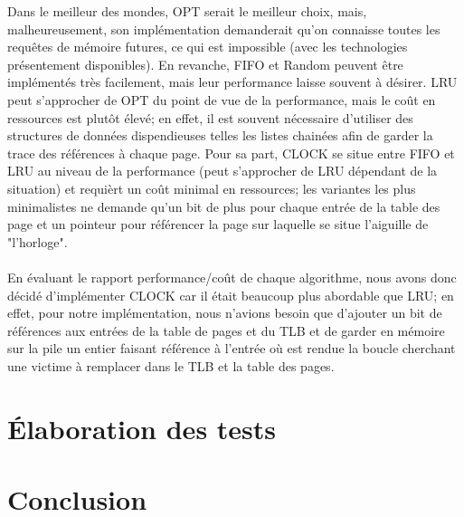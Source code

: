 \documentclass{article}
\begin{document}
Dans le meilleur des mondes, OPT serait le meilleur choix, mais, malheureusement, son implémentation demanderait qu'on connaisse toutes les 
requêtes de mémoire futures, ce qui est impossible (avec les technologies présentement disponibles). En revanche, FIFO et Random peuvent être 
implémentés très facilement, mais leur performance laisse souvent à désirer. LRU peut s'approcher de OPT du point de vue de la performance, mais 
le coût en ressources est plutôt élevé; en effet, il est souvent nécessaire d'utiliser des structures de données dispendieuses telles les listes 
chainées afin de garder la trace des références à chaque page. Pour sa part, CLOCK se situe entre FIFO et LRU au niveau de la performance (peut 
s'approcher de LRU dépendant de la situation) et requièrt un coût minimal en ressources; les variantes les plus minimalistes ne demande qu'un bit 
de plus pour chaque entrée de la table des page et un pointeur pour référencer la page sur laquelle se situe l'aiguille de "l'horloge".\\
\\
En évaluant le rapport performance/coût de chaque algorithme, nous avons donc décidé d'implémenter CLOCK car il était beaucoup plus abordable que 
LRU; en effet, pour notre implémentation, nous n'avions besoin que d'ajouter un bit de références aux entrées de la table de pages et du TLB et 
de garder en mémoire sur la pile un entier faisant référence à l'entrée où est rendue la boucle cherchant une victime à remplacer dans le TLB et 
la table des pages.\\ 
\section{Élaboration des tests}
\setlength{\parindent}{20pt}

\section{Conclusion}
\setlength{\parindent}{20pt}
\end{document}

